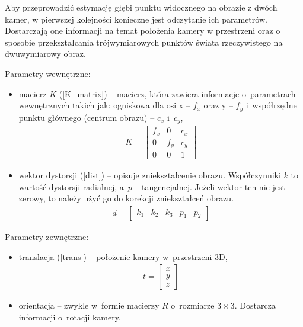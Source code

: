 Aby przeprowadzić estymację głębi punktu widocznego na obrazie z dwóch kamer, w pierwszej kolejności konieczne jest odczytanie ich parametrów. Dostarczają one informacji na temat położenia kamery w przestrzeni oraz o sposobie przekształcania trójwymiarowych punktów świata rzeczywistego na dwuwymiarowy obraz.

\vspace{11px}
\noindent Parametry wewnętrzne:

\begin{itemize}
    \item macierz $K$ (\ref{K_matrix}) -- macierz, która zawiera informacje o~parametrach wewnętrznych takich jak: ogniskowa dla osi x -- $f_x$ oraz y -- $f_y$ i~współrzędne punktu głównego (centrum obrazu) -- $c_x$ i~$c_y$,
    \begin{align}
        K = \begin{bmatrix} \label{K_matrix}
        f_x & 0 & c_x \\
        0 & f_y & c_y \\
        0 & 0 & 1
        \end{bmatrix}
    \end{align}
    \item wektor dystorsji (\ref{dist}) -- opisuje zniekształcenie obrazu. Współczynniki $k$ to wartość dystorsji radialnej, a~$p$ -- tangencjalnej. Jeżeli wektor ten nie jest zerowy, to należy użyć go do korekcji zniekształceń obrazu.
    \begin{align}
        d = \begin{bmatrix} \label{dist}
        k_1 & k_2 & k_3 & p_1 & p_2
        \end{bmatrix}
    \end{align}
\end{itemize}

\noindent Parametry zewnętrzne:

\begin{itemize}
    \item translacja (\ref{trans}) -- położenie kamery w~przestrzeni 3D,
    \begin{align}
        t = \begin{bmatrix} \label{trans}
        x \\ y \\ z
        \end{bmatrix}
    \end{align}
    \item orientacja -- zwykle w~formie macierzy $R$ o~rozmiarze $3 \times 3$. Dostarcza informacji o~rotacji kamery.
\end{itemize}

